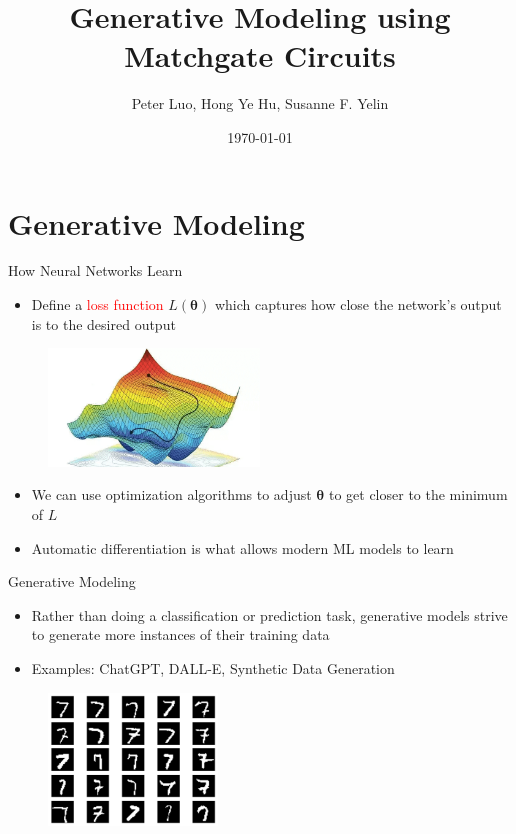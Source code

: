 \documentclass[xcolor=dvipsnames]{beamer}
\title[Modeling using Matchgates]{Generative Modeling using Matchgate Circuits}
\author{Peter Luo, Hong Ye Hu, Susanne F. Yelin}
\date{\today}
\begin{document}
\frame{\titlepage}

\section{Generative Modeling}

\begin{frame}{How Neural Networks Learn}
  
  \begin{itemize}
    \item Define a \textcolor{red}{loss function} $L(\bm{\theta})$ which captures how close the network's output is to the desired output
  \end{itemize}

  \begin{figure}
    \centering
    \includegraphics[width=0.5\textwidth]{gd.png}
  \end{figure}

  \begin{itemize}
    \item We can use optimization algorithms to adjust $\bm{\theta}$ to get closer to the minimum of $L$ 
    \item Automatic differentiation is what allows modern ML models to learn
  \end{itemize}

\end{frame}

\begin{frame}{Generative Modeling}

    \begin{itemize}
      \item Rather than doing a classification or prediction task, generative models strive to generate more instances of their training data
      \item Examples: ChatGPT, DALL-E, Synthetic Data Generation 
    \end{itemize}
    \begin{figure}
      \centering
          \includegraphics[width=0.4\textwidth]{MNIST.png}
      \end{figure}

\end{frame}
\end{document}
